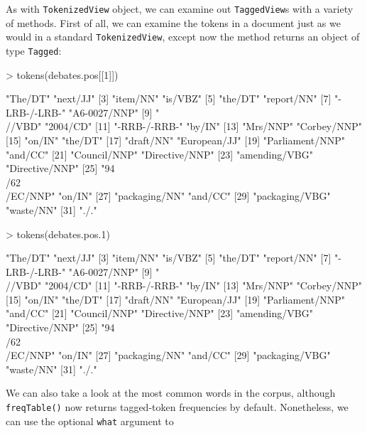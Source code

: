 \documentclass[11pt]{article}
\let\code=\texttt
\let\rclass=\texttt
\begin{document}
As with \rclass{TokenizedView} object, we can examine out
\rclass{TaggedView}s with a variety of methods.  First of all, we can
examine the tokens in a document just as we would in a standard
\rclass{TokenizedView}, except now the method returns an object of
type \rclass{Tagged}:
\begin{Schunk}
\begin{Sinput}
> tokens(debates.pos[[1]])
\end{Sinput}
\begin{Soutput}
 [1] "The/DT"           "next/JJ"         
 [3] "item/NN"          "is/VBZ"          
 [5] "the/DT"           "report/NN"       
 [7] "-LRB-/-LRB-"      "A6-0027/NNP"     
 [9] "\\//VBD"          "2004/CD"         
[11] "-RRB-/-RRB-"      "by/IN"           
[13] "Mrs/NNP"          "Corbey/NNP"      
[15] "on/IN"            "the/DT"          
[17] "draft/NN"         "European/JJ"     
[19] "Parliament/NNP"   "and/CC"          
[21] "Council/NNP"      "Directive/NNP"   
[23] "amending/VBG"     "Directive/NNP"   
[25] "94\\/62\\/EC/NNP" "on/IN"           
[27] "packaging/NN"     "and/CC"          
[29] "packaging/VBG"    "waste/NN"        
[31] "./."             
\end{Soutput}
\begin{Sinput}
> tokens(debates.pos.1)
\end{Sinput}
\begin{Soutput}
 [1] "The/DT"           "next/JJ"         
 [3] "item/NN"          "is/VBZ"          
 [5] "the/DT"           "report/NN"       
 [7] "-LRB-/-LRB-"      "A6-0027/NNP"     
 [9] "\\//VBD"          "2004/CD"         
[11] "-RRB-/-RRB-"      "by/IN"           
[13] "Mrs/NNP"          "Corbey/NNP"      
[15] "on/IN"            "the/DT"          
[17] "draft/NN"         "European/JJ"     
[19] "Parliament/NNP"   "and/CC"          
[21] "Council/NNP"      "Directive/NNP"   
[23] "amending/VBG"     "Directive/NNP"   
[25] "94\\/62\\/EC/NNP" "on/IN"           
[27] "packaging/NN"     "and/CC"          
[29] "packaging/VBG"    "waste/NN"        
[31] "./."             
\end{Soutput}
\end{Schunk}
We can also take a look at the most common words in the corpus,
although \code{freqTable()} now returns tagged-token frequencies by
default.  Nonetheless, we can use the optional \code{what} argument to
\end{document}
